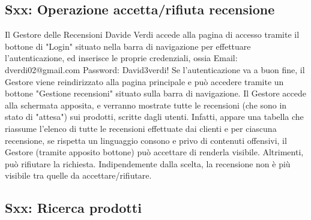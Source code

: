 \documentclass[12pt, a4paper, oneside]{book}
\begin{document}
    \subsection*{Sxx: Operazione accetta/rifiuta recensione}
    Il Gestore delle Recensioni Davide Verdi accede alla pagina di accesso tramite il bottone di "Login" situato nella barra di navigazione per effettuare l'autenticazione, ed inserisce le proprie credenziali, ossia Email: dverdi02@gmail.com Password: David3verdi!
    Se l'autenticazione va a buon fine, il Gestore viene reindirizzato alla pagina principale e può accedere tramite un bottone "Gestione recensioni" situato sulla barra di navigazione.
    Il Gestore accede alla schermata apposita, e verranno mostrate tutte le recensioni (che sono in stato di "attesa") sui prodotti, scritte dagli utenti. Infatti, appare una tabella che riassume l'elenco di tutte le recensioni effettuate dai clienti e per ciascuna recensione, se rispetta un linguaggio consono e privo di contenuti offensivi, il Gestore (tramite apposito bottone) può accettare di renderla visibile. Altrimenti, può rifiutare la richiesta.
    Indipendemente dalla scelta, la recensione non è più visibile tra quelle da accettare/rifiutare.

    \subsection*{Sxx: Ricerca prodotti}
\end{document}

